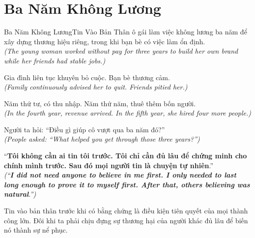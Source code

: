 \section{Ba Năm Không Lương}
\begin{truyen}{Ba Năm Không Lương}{Tin Vào Bản Thân}
ô gái làm việc không lương ba năm để xây dựng thương hiệu riêng, trong khi bạn bè có việc làm ổn định.\\
\textit{(The young woman worked without pay for three years to build her own brand while her friends had stable jobs.)}

Gia đình liên tục khuyên bỏ cuộc. Bạn bè thương cảm.\\
\textit{(Family continuously advised her to quit. Friends pitied her.)}

Năm thứ tư, có thu nhập. Năm thứ năm, thuê thêm bốn người.\\
\textit{(In the fourth year, revenue arrived. In the fifth year, she hired four more people.)}

Người ta hỏi: ``Điều gì giúp cô vượt qua ba năm đó?''\\
\textit{(People asked: ``What helped you get through those three years?'')}

``\textbf{Tôi không cần ai tin tôi trước. Tôi chỉ cần đủ lâu để chứng minh cho chính mình trước. Sau đó mọi người tin là chuyện tự nhiên}.''\\
\textit{(``\textbf{I did not need anyone to believe in me first. I only needed to last long enough to prove it to myself first. After that, others believing was natural}.'')}
\end{truyen}
\begin{baihoc}
  Tin vào bản thân trước khi có bằng chứng là điều kiện tiên quyết của mọi thành công lớn. Đôi khi ta phải chịu đựng sự thương hại của người khác đủ lâu để biến nó thành sự nể phục.
\end{baihoc}

